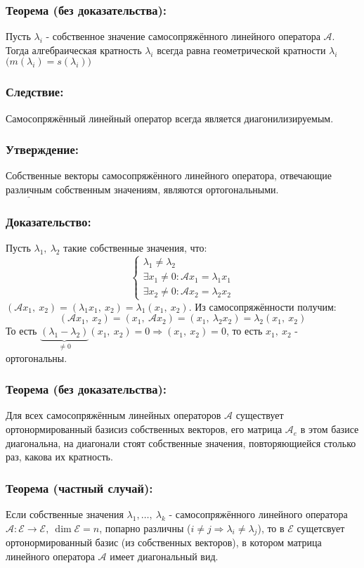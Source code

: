 \documentclass[12pt, letterpaper, twoside]{article}
\newcommand{\Underl}[1]{$\underline{\text{#1}}$}
\begin{document}
    \subsubsection*{Теорема (без доказательства):}
    Пусть $\lambda_i$ - собственное значение самосопряжённого линейного оператора $\mathcal{A}$. Тогда алгебраическая кратность $\lambda_i$ всегда равна геометрической кратности $\lambda_i$ $\big(m(\lambda_i) = s(\lambda_i) \big)$
    \subsubsection*{Следствие:}
    Самосопряжённый линейный оператор всегда является диагонилизируемым.
    \subsubsection*{Утверждение:}
    Собственные векторы самосопряжённого линейного оператора, отвечающие \Underl{различным} собственным значениям, являются ортогональными.
    \subsubsection*{Доказательство:}
    Пусть $\lambda_1,\ \lambda_2$ такие собственные значения, что:
    \[\begin{cases}
        \lambda_1 \neq \lambda_2\\
        \exists x_1 \neq 0: \mathcal{A}x_1 = \lambda_1 x_1\\
        \exists x_2 \neq 0: \mathcal{A}x_2 = \lambda_2 x_2
    \end{cases}\]
    $(\mathcal{A}x_1,\ x_2) = (\lambda_1 x_1,\ x_2) = \lambda_1(x_1,\ x_2)$. Из самосопряжённости получим:
    \[(\mathcal{A}x_1,\ x_2) = (x_1,\ \mathcal{A}x_2) = (x_1,\ \lambda_2 x_2) = \lambda_2 (x_1,\ x_2)\]
    То есть $\underset{\neq 0}{\underbrace{(\lambda_1 - \lambda_2)}}(x_1,\ x_2) = 0\Rightarrow (x_1,\ x_2) = 0$, то есть $x_1,\ x_2$ - ортогональны.
    \subsubsection*{Теорема (без доказательства):}
    Для всех самосопряжённым линейных операторов $\mathcal{A}$ существует ортонормированный базисиз собственных векторов, его матрица $\mathcal{A}_e$ в этом базисе диагональна, на диагонали стоят собственные значения, повторяющиейся столько раз, какова их кратность.
    \subsubsection*{Теорема (частный случай):}
    Если собственные значения $\lambda_1,\dots,\ \lambda_k$ - самосопряжённого линейного оператора $\mathcal{A}: \mathcal{E} \longrightarrow \mathcal{E},\ \dim \mathcal{E} = n$, попарно различны ($i \neq j \Rightarrow \lambda_i \neq \lambda_j$), то в $\mathcal{E}$ сущетсвует ортонормированный базис (из собственных векторов), в котором матрица линейного оператора $\mathcal{A}$ имеет диагональный вид.
\end{document}

